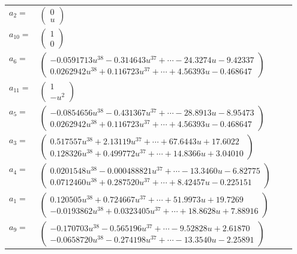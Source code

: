 \documentclass[1p]{elsarticle_modified}
\theoremstyle{definition}
\begin{document}
\begin{tabular}{m{7pt} m{180pt} m{7pt} m{180pt} }
\flushright $a_{2}=$&$\begin{pmatrix}0\\u\end{pmatrix}$ \\
\flushright $a_{10}=$&$\begin{pmatrix}1\\0\end{pmatrix}$ \\
\flushright $a_{6}=$&$\begin{pmatrix}-0.0591713 u^{38}-0.314643 u^{37}+\cdots-24.3274 u-9.42337\\0.0262942 u^{38}+0.116723 u^{37}+\cdots+4.56393 u-0.468647\end{pmatrix}$ \\
\flushright $a_{11}=$&$\begin{pmatrix}1\\- u^2\end{pmatrix}$ \\
\flushright $a_{5}=$&$\begin{pmatrix}-0.0854656 u^{38}-0.431367 u^{37}+\cdots-28.8913 u-8.95473\\0.0262942 u^{38}+0.116723 u^{37}+\cdots+4.56393 u-0.468647\end{pmatrix}$ \\
\flushright $a_{3}=$&$\begin{pmatrix}0.517557 u^{38}+2.13119 u^{37}+\cdots+67.6443 u+17.6022\\0.128326 u^{38}+0.499772 u^{37}+\cdots+14.8366 u+3.04010\end{pmatrix}$ \\
\flushright $a_{4}=$&$\begin{pmatrix}0.0201548 u^{38}-0.000488821 u^{37}+\cdots-13.3460 u-6.82775\\0.0712460 u^{38}+0.287520 u^{37}+\cdots+8.42457 u-0.225151\end{pmatrix}$ \\
\flushright $a_{1}=$&$\begin{pmatrix}0.120505 u^{38}+0.724667 u^{37}+\cdots+51.9973 u+19.7269\\-0.0193862 u^{38}+0.0323405 u^{37}+\cdots+18.8628 u+7.88916\end{pmatrix}$ \\
\flushright $a_{9}=$&$\begin{pmatrix}-0.170703 u^{38}-0.565196 u^{37}+\cdots-9.52828 u+2.61870\\-0.0658720 u^{38}-0.274198 u^{37}+\cdots-13.3540 u-2.25891\end{pmatrix}$ \\

\end{tabular}
\end{document}
